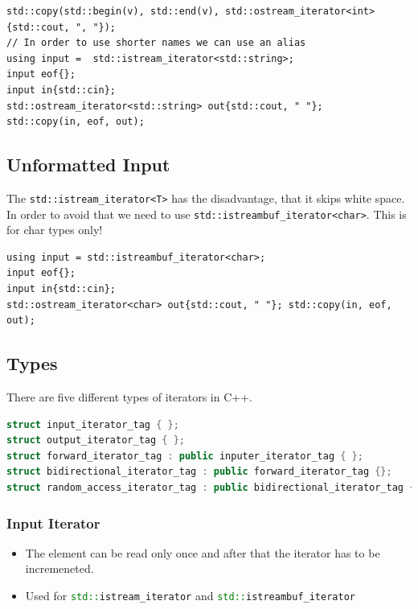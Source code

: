 \begin{lstlisting}
std::copy(std::begin(v), std::end(v), std::ostream_iterator<int>{std::cout, ", "});
// In order to use shorter names we can use an alias
using input =  std::istream_iterator<std::string>; 
input eof{}; 
input in{std::cin}; 
std::ostream_iterator<std::string> out{std::cout, " "}; 
std::copy(in, eof, out);
\end{lstlisting}

\subsection{Unformatted Input}
The \lstinline|std::istream_iterator<T>| has the disadvantage, that it skips white space. In order to avoid that we need to use \lstinline|std::istreambuf_iterator<char>|. This is for char types only!

\begin{lstlisting}
using input = std::istreambuf_iterator<char>; 
input eof{}; 
input in{std::cin}; 
std::ostream_iterator<char> out{std::cout, " "}; std::copy(in, eof, out);
\end{lstlisting}



\subsection{Types}
There are five different types of iterators in C++.

\begin{lstlisting}[language=C++]
struct input_iterator_tag { };
struct output_iterator_tag { };
struct forward_iterator_tag : public inputer_iterator_tag { };
struct bidirectional_iterator_tag : public forward_iterator_tag {};
struct random_access_iterator_tag : public bidirectional_iterator_tag { };
\end{lstlisting}

\subsubsection{Input Iterator}
\begin{itemize}
  \itemsep -0.5em 
  \item The element can be read only once and after that the iterator has to be incremeneted.
  \item Used for \lstinline[language=C++]|std::istream_iterator| and \lstinline[language=C++]|std::istreambuf_iterator|
\end{itemize}

